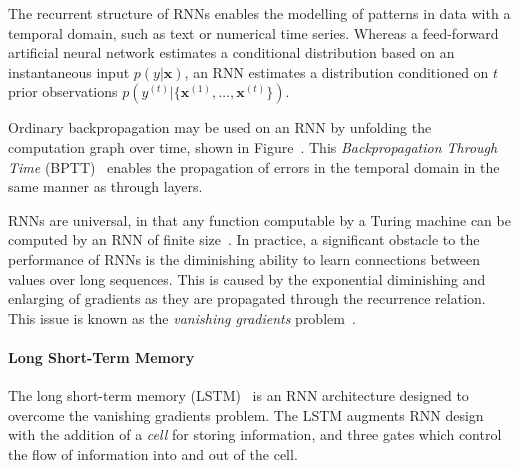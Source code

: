 The recurrent structure of RNNs enables the modelling of patterns in data with a temporal domain, such as text or numerical time series. Whereas a feed-forward artificial neural network estimates a conditional distribution based on an instantaneous input $p(y | \bm{x})$, an RNN estimates a distribution conditioned on $t$ prior observations $p\left(y^{(t)} | \{ \bm{x}^{(1)}, \ldots, \bm{x}^{(t)} \} \right)$.

Ordinary backpropagation may be used on an RNN by unfolding the computation graph over time, shown in Figure~. This \emph{Backpropagation Through Time} (BPTT)~\cite{Werbos1990a} enables the propagation of errors in the temporal domain in the same manner as through layers.

RNNs are universal, in that any function computable by a Turing machine can be computed by an RNN of finite size~\cite{Sontag1991}. In practice, a significant obstacle to the performance of RNNs is the diminishing ability to learn connections between values over long sequences. This is caused by the exponential diminishing and enlarging of gradients as they are propagated through the recurrence relation. This issue is known as the
\emph{vanishing gradients} problem~\cite{Bengio1994}.




\paragraph*{Long Short-Term Memory}

The long short-term memory (LSTM)~\cite{Hochreiter1997} is an RNN architecture designed to overcome the vanishing gradients problem. The LSTM augments RNN design with the addition of a \emph{cell} for storing information, and three gates which control the flow of information into and out of the cell.


